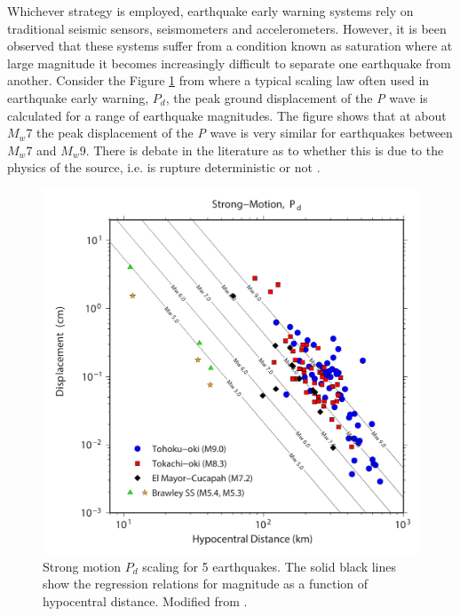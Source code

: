 Whichever strategy is employed, earthquake early warning systems rely on traditional seismic sensors, seismometers and accelerometers. However, it is been observed that these systems suffer from a condition known as saturation \citep{Brown2011} where at large magnitude it becomes increasingly difficult to separate one earthquake from another. Consider the Figure \ref{fig_pd_scaling} from \citet{Crowell2013} where a typical scaling law often used in earthquake early warning, $P_d$, the peak ground displacement of the \textit{P} wave \citep{wu2007_Pd} is calculated for a range of earthquake magnitudes. The figure shows that at about $M_w$7 the peak displacement of the \textit{P} wave is very similar for earthquakes between $M_w$7 and $M_w$9. There is debate in the literature as to whether this is due to the physics of the source, i.e. is rupture deterministic or not \citep{olson2005}.

\begin{figure}[!ht] 
  \centering
  \includegraphics[width=0.99\linewidth]{./figures/ch1/pd_scaling.pdf}
    \caption[Strong motion $P_d$ scaling for 5 earthquakes]{Strong motion $P_d$ scaling for 5 earthquakes. The solid black lines show the regression relations for magnitude as a function of hypocentral distance. Modified from \citet{Crowell2013}.}
  \label{fig_pd_scaling}
\end{figure}

